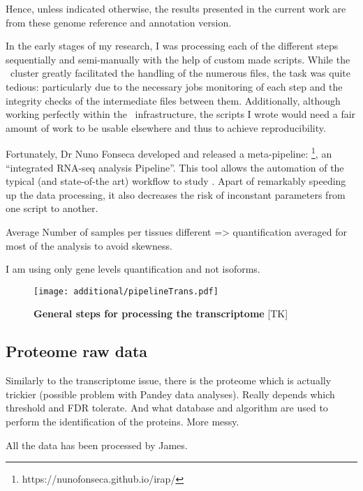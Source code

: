 Hence, unless indicated otherwise, the results presented in the current work are
from these genome reference and annotation version.

In the early stages of my research, I was processing each of the different steps
sequentially and semi-manually with the help of custom made scripts.
While the \EBI\ cluster greatly facilitated the handling of the numerous files,
the task was quite tedious: particularly due to the necessary jobs monitoring of
each step and the integrity checks of the intermediate files between them.
Additionally, although working perfectly within the \EBI\ infrastructure,
the scripts I wrote would need a fair amount of work to be usable elsewhere and
thus to achieve reproducibility.

Fortunately, Dr Nuno Fonseca developed and released a meta-pipeline:
\irap\footnote{https://nunofonseca.github.io/irap/}, an ``integrated RNA-seq
analysis Pipeline''. This tool allows
the automation of the typical (and state-of-the art) workflow to study
\Rnaseq. Apart of remarkably speeding up the data processing, it also
decreases the risk of inconstant parameters from one script to another.



Average Number of samples per tissues different => quantification averaged for
most of the analysis to avoid skewness.

I am using only gene levels quantification and not isoforms.




\begin{figure}
    \texttt{[image: additional/pipelineTrans.pdf]}\centering
    \caption[General steps for processing the transcriptomic
    data]{\label{fig:pipelineTrans}\textbf{General steps for processing the
    transcriptome} [TK]}
  \end{figure}


\subsection{Proteome raw data}

Similarly to the transcriptome issue, there is the proteome which is actually
trickier (possible problem with Pandey data analyses). Really depends which
threshold and \gls{FDR} tolerate. And what database and algorithm are used to perform
the identification of the proteins. More messy.

All the data has been processed by James.

